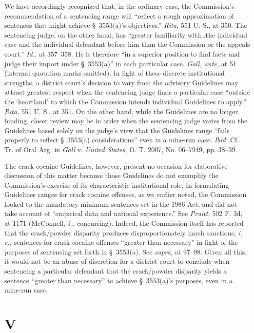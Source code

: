 {{  We have accordingly recognized that, in the ordinary case, the
Commission's recommendation of a sentencing range will ``reflect a
rough approximation of sentences that might achieve \S~3553(a)'s
objectives.'' \emph{Rita,} 551 U. S., at 350. The sentencing judge, on
the other hand, has ``greater familiarity with\dots the individual
case and the individual defendant before him than the Commission or
the appeals court.'' \emph{Id.,} at 357--358. He is therefore
``in a superior position to find facts and judge their import under
\S~3553(a)'' in each particular case. \emph{Gall, ante,} at 51
(internal quotation marks omitted). In light of these discrete
institutional strengths, a district court's decision to vary from the
advisory Guidelines may attract greatest respect when the sentencing
judge finds a particular case ``outside the ‘heartland' to which
the Commission intends individual Guidelines to apply.'' \emph{Rita,}
551 U. S., at 351. On the other hand, while the Guidelines are no
longer binding, closer review may be in order when the sentencing
judge varies from the Guidelines based solely on the judge's view
that the Guidelines range ``fails properly to reflect \S~3553(a)
considerations'' even in a mine-run case. \emph{Ibid.} Cf. Tr. of Oral
Arg. in \emph{Gall} v. \emph{United States,} O. T. 2007, No. 06--7949, pp.
38--39.

  The crack cocaine Guidelines, however, present no occasion for
elaborative discussion of this matter because those Guidelines do
not exemplify the Commission's exercise of its characteristic
institutional role. In formulating Guidelines ranges for crack cocaine
offenses, as we earlier noted, the Commission looked to the mandatory
minimum sentences set in the 1986 Act, and did not take account of
``empirical data and national experience.'' See \emph{Pruitt,} 502
F. 3d, at 1171 \newpage  (McConnell, J., concurring). Indeed, the
Commission itself has reported that the crack/powder disparity produces
disproportionately harsh sanctions, \emph{i. e.,} sentences for crack
cocaine offenses ``greater than necessary'' in light of the purposes
of sentencing set forth in \S~3553(a). See \emph{supra,} at 97--98.
Given all this, it would not be an abuse of discretion for a district
court to conclude when sentencing a particular defendant that the
crack/powder disparity yields a sentence ``greater than necessary'' to
achieve \S~3553(a)'s purposes, even in a mine-run case.

\section{V}

}}
